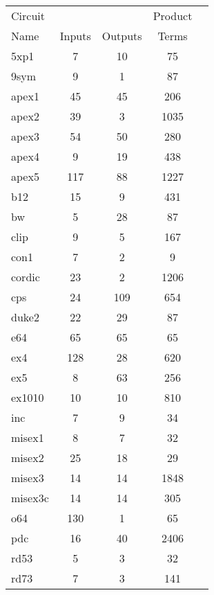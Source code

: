 {\begin{pespace}
\begin{center}
\begin{tabular}{|l|c|c|c|c|}
Circuit     &             &              &Product \\
 Name       &Inputs       &  Outputs     & Terms  \\
\hline
5xp1        &  7          &   10         & 75   \\
9sym        &  9          &    1         & 87   \\
apex1       &  45         &   45         & 206  \\
apex2       &  39         &    3         & 1035 \\
apex3       &  54         &   50         & 280  \\
apex4       &  9          &   19         & 438  \\
apex5       &  117        &   88         & 1227 \\
b12         &  15         &    9         & 431  \\
bw          &  5          &   28         & 87   \\
clip        &  9          &    5         & 167  \\
con1        &  7          &    2         & 9    \\
cordic      &  23         &    2         & 1206 \\
cps         &  24         &  109         & 654  \\
duke2       &  22         &   29         & 87   \\
e64         &  65         &   65         & 65   \\
ex4         &  128        &   28         & 620  \\
ex5         &  8          &   63         & 256  \\
ex1010      &  10         &   10         & 810  \\
inc         &  7          &    9         & 34   \\
misex1      &  8          &    7         & 32   \\
misex2      &  25         &   18         & 29   \\
misex3      &  14         &   14         & 1848 \\
misex3c     &  14         &   14         & 305  \\
o64         &  130        &    1         & 65   \\
pdc         &  16         &   40         & 2406 \\
rd53        &  5          &    3         & 32   \\
rd73        &  7          &    3         & 141  \\

\end{tabular}
\end{center}
\end{pespace}}
